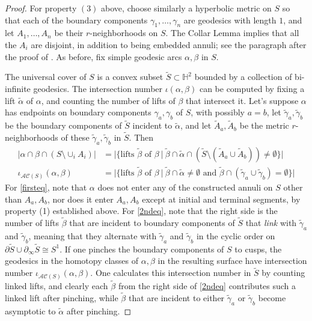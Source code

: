\documentclass[11pt]{amsart}
\theoremstyle{remark}
\numberwithin{equation}{section}
\begin{document}
\begin{proof}
For property $(3)$ above, choose similarly a hyperbolic metric on $S$ so that each of the boundary components $\gamma_1,\ldots,\gamma_n$ are geodesics with length $1$, and let $A_1,\ldots,A_n$ be their $r$-neighborhoods on $S$. The Collar Lemma implies that all the $A_i$ are disjoint, in addition to being embedded annuli; see the paragraph after the proof of \cite[Lem 13.6]{Farbprimer}.  As before, fix simple geodesic arcs $\alpha,\beta$ in $S$.

The universal cover of $S$  is a convex subset $\tilde S \subset \mathbb{H}^2$ bounded by a collection of bi-infinite geodesics.  The intersection number $\iota(\alpha,\beta)$ can be computed by fixing a lift $\tilde \alpha$ of $\alpha$, and counting the number of lifts of $\beta$ that intersect it. Let's suppose $\alpha$ has  endpoints on boundary components $\gamma_a,\gamma_b$ of $S$, with possibly $a=b$, let $\tilde \gamma_a,\tilde \gamma_b$ be the boundary components of $\tilde S$ incident to $\tilde \alpha$, and let $\tilde A_a,\tilde A_b$ be the metric $r$-neighborhoods of these $\tilde \gamma_a,\tilde \gamma_b$ in $\tilde S$. Then
\begin{align}\label{firsteq} |\alpha  \cap \beta \cap (S \setminus \cup_i A_i)| &= \big |\big\{\text{lifts } \tilde \beta \text{ of } \beta \ \big | \ \tilde \beta \cap \tilde \alpha \cap (\tilde S \setminus (\tilde A_a \cup \tilde A_b) )\neq \emptyset \big \} \big | \\
\label{2ndeq}\iota_{\mathcal {AC}(S)}(\alpha,\beta)&=\big |\big\{\text{lifts } \tilde \beta \text{ of } \beta \ \big | \ \tilde \beta \cap \tilde \alpha \neq \emptyset \text{ and } \tilde \beta \cap (\tilde \gamma_a \cup \tilde \gamma_b) = \emptyset \big \} \big |\end{align}
For \eqref{firsteq}, note that  $\alpha $ does not enter any of the constructed annuli on $S$ other than $A_a,A_b$, nor does it enter $A_a,A_b$ except at initial and terminal segments, by property (1) established above. For \eqref{2ndeq},   note that the right side is the number of lifts $\tilde \beta$ that are incident to boundary components of $\tilde S$ that \emph{link} with $\tilde \gamma_a$ and $\tilde \gamma_b$,  meaning that they alternate with $\tilde \gamma_a$ and $\tilde \gamma_b$ in the  cyclic order on $\partial \tilde S \cup \partial_\infty \tilde S \cong S^1$. If one pinches the boundary components of $S$ to cusps, the geodesics in the homotopy classes of $\alpha,\beta$ in the resulting surface  have intersection number $\iota_{\mathcal {AC}(S)}(\alpha,\beta)$. One calculates this intersection number in $\tilde S$ by counting linked lifts, and clearly each $\tilde \beta$ from the right side of \eqref{2ndeq} contributes such a linked lift after pinching, while $\tilde \beta$ that are incident to either $\tilde \gamma_a$ or $\tilde \gamma_b$ become asymptotic to $\tilde\alpha$ after pinching.


\end{proof}
\end{document}
